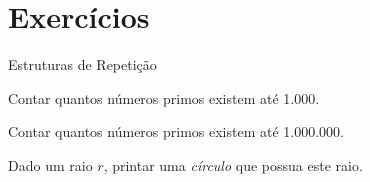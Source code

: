 
\section{Exercícios}

\begin{slide}{Estruturas de Repetição}

    \item Contar quantos números primos existem até 1.000.
    
    \item Contar quantos números primos existem até 1.000.000.

    \item Dado um raio $r$, printar uma \textit{círculo} que possua este raio.

\end{slide}